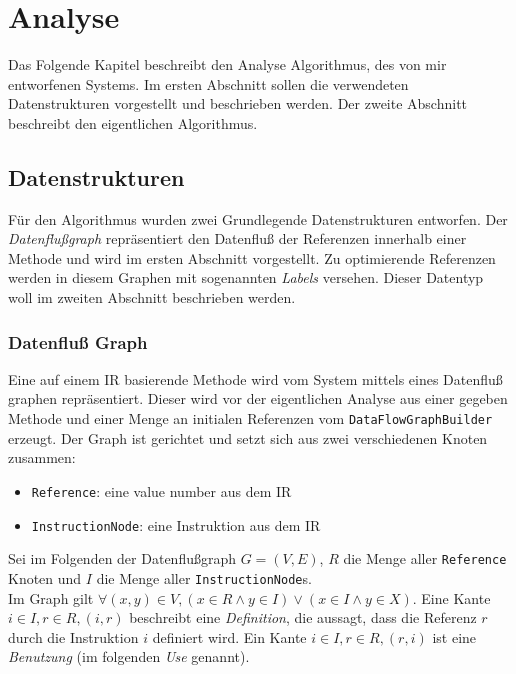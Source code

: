 \chapter{Analyse}

Das Folgende Kapitel beschreibt den Analyse Algorithmus, des von mir entworfenen Systems.
Im ersten Abschnitt sollen die verwendeten Datenstrukturen vorgestellt und beschrieben werden.
Der zweite Abschnitt beschreibt den eigentlichen Algorithmus.

\section{Datenstrukturen}

Für den Algorithmus wurden zwei Grundlegende Datenstrukturen entworfen. Der 
\textit{Datenflußgraph} repräsentiert den Datenfluß der Referenzen innerhalb 
einer Methode und wird im ersten Abschnitt vorgestellt. Zu optimierende Referenzen
werden in diesem Graphen mit sogenannten \textit{Labels} versehen. Dieser Datentyp
woll im zweiten Abschnitt beschrieben werden.

\subsection{Datenfluß Graph}

Eine auf einem IR basierende Methode wird vom System mittels eines Datenfluß
graphen repräsentiert. Dieser wird vor der eigentlichen Analyse aus einer gegeben
Methode und einer Menge an initialen Referenzen vom \texttt{DataFlowGraphBuilder}
erzeugt. Der Graph ist gerichtet und setzt sich aus zwei verschiedenen Knoten zusammen:

\begin{itemize}
	\item \texttt{Reference}: eine value number aus dem IR
	\item \texttt{InstructionNode}: eine Instruktion aus dem IR
\end{itemize}

Sei im Folgenden der Datenflußgraph $G = (V, E)$, $R$ die Menge aller \texttt{Reference} 
Knoten und $I$ die Menge aller \texttt{InstructionNode}s. 
\\
Im Graph gilt $\forall (x,y) \in V,  (x \in R \wedge y \in I) \vee (x \in I \wedge y \in X)$.
Eine Kante $i \in I, r \in R, (i, r)$ beschreibt eine \textit{Definition}, die aussagt, 
dass die Referenz $r$ durch die Instruktion $i$ definiert wird. Ein Kante 
$i \in I, r \in R, (r, i)$ ist eine \textit{Benutzung} (im folgenden \textit{Use}
genannt). 

